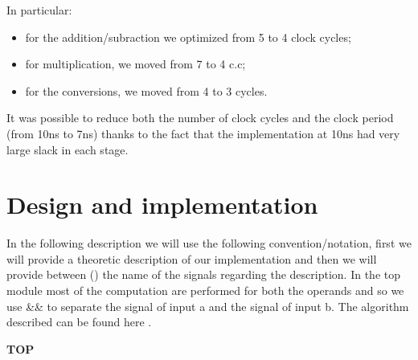 In particular:
\begin{itemize}
 \item for the addition/subraction we optimized from 5 to 4 clock cycles;
 \item for multiplication, we moved from 7 to 4 c.c;
 \item for the conversions, we moved from 4 to 3 cycles.
\end{itemize} 
It was possible to reduce both the number of clock cycles and the clock period (from 10ns to 7ns)  thanks to the fact that the implementation at 10ns had very large slack in each stage.


\pagebreak

\section{Design and implementation}
In the following description we will use the following convention/notation, first we will provide a theoretic description of our implementation and then we will provide between () the name of the signals regarding the description. In the top module most of the computation are performed for both the operands and so we use \&\& to separate the signal of input a and the signal of input b.
The algorithm described can be found here \cite{mor1kxRep}.
\newline

\textbf{TOP}
\newline

